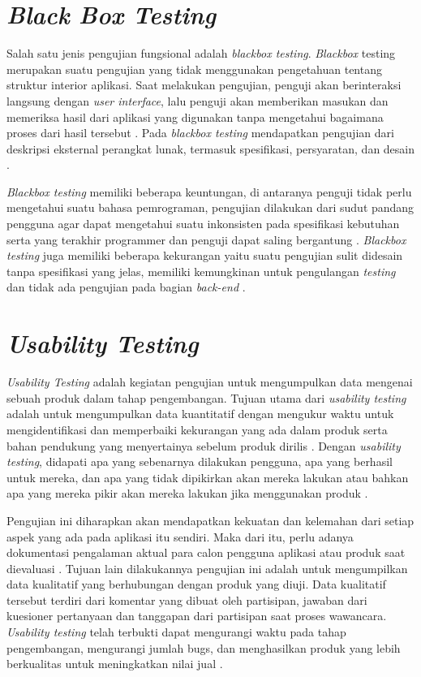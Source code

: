 \section{\textit{Black Box Testing}}
Salah satu jenis pengujian fungsional adalah \textit{blackbox testing}. \textit{Blackbox} testing merupakan suatu pengujian yang tidak menggunakan pengetahuan tentang struktur interior aplikasi. Saat melakukan pengujian, penguji akan berinteraksi langsung dengan \textit{user interface}, lalu penguji akan memberikan masukan dan memeriksa hasil dari aplikasi yang digunakan tanpa mengetahui bagaimana proses dari hasil tersebut \citep{xu2016comparative}. Pada \textit{blackbox testing} mendapatkan pengujian dari deskripsi eksternal perangkat lunak, termasuk spesifikasi, persyaratan, dan desain \citep{ammann2016introduction}.

\par \textit{Blackbox testing} memiliki beberapa keuntungan, di antaranya penguji tidak perlu mengetahui suatu bahasa pemrograman, pengujian dilakukan dari sudut pandang pengguna agar dapat mengetahui suatu inkonsisten pada spesifikasi kebutuhan serta yang terakhir programmer dan penguji dapat saling bergantung \citep{jaya2018pengujian}. \textit{Blackbox testing} juga memiliki beberapa kekurangan yaitu suatu pengujian sulit didesain tanpa spesifikasi yang jelas, memiliki kemungkinan untuk pengulangan \textit{testing} dan tidak ada pengujian pada bagian \textit{back-end} \citep{jaya2018pengujian}.

\section{\textit{Usability Testing}}
\textit{Usability Testing} adalah kegiatan pengujian untuk mengumpulkan data mengenai sebuah produk dalam tahap pengembangan. Tujuan utama dari \textit{usability testing} adalah untuk mengumpulkan data kuantitatif dengan mengukur waktu untuk mengidentifikasi dan memperbaiki kekurangan yang ada dalam produk serta bahan pendukung yang menyertainya sebelum produk dirilis \citep{rubin2008handbook}. Dengan \textit{usability testing}, didapati apa yang sebenarnya dilakukan pengguna, apa yang berhasil untuk mereka, dan apa yang tidak dipikirkan akan mereka lakukan atau bahkan apa yang mereka pikir akan mereka lakukan jika menggunakan produk \citep{barnum2020usability}.


\par Pengujian ini diharapkan akan mendapatkan kekuatan dan kelemahan dari setiap aspek yang ada pada aplikasi itu sendiri. Maka dari itu, perlu adanya dokumentasi pengalaman aktual para calon pengguna aplikasi atau produk saat dievaluasi \citep{wesfix2017branding}. Tujuan lain dilakukannya pengujian ini adalah untuk mengumpilkan data kualitatif yang berhubungan dengan produk yang diuji. Data kualitatif tersebut terdiri dari komentar yang dibuat oleh partisipan, jawaban dari kuesioner pertanyaan dan tanggapan dari partisipan saat proses wawancara. \textit{Usability testing} telah terbukti dapat mengurangi waktu pada tahap pengembangan, mengurangi jumlah bugs, dan menghasilkan produk yang lebih berkualitas untuk meningkatkan nilai jual \citep{wahl2000student}.


